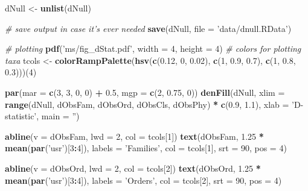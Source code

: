 \documentclass[]{article}
\newenvironment{Shaded}{\begin{snugshade}}{\end{snugshade}}
\newcommand{\KeywordTok}[1]{\textcolor[rgb]{0.13,0.29,0.53}{\textbf{#1}}}
\newcommand{\DataTypeTok}[1]{\textcolor[rgb]{0.13,0.29,0.53}{#1}}
\newcommand{\DecValTok}[1]{\textcolor[rgb]{0.00,0.00,0.81}{#1}}
\newcommand{\FloatTok}[1]{\textcolor[rgb]{0.00,0.00,0.81}{#1}}
\newcommand{\StringTok}[1]{\textcolor[rgb]{0.31,0.60,0.02}{#1}}
\newcommand{\CommentTok}[1]{\textcolor[rgb]{0.56,0.35,0.01}{\textit{#1}}}
\newcommand{\OperatorTok}[1]{\textcolor[rgb]{0.81,0.36,0.00}{\textbf{#1}}}
\newcommand{\NormalTok}[1]{#1}
\begin{document}
\begin{Shaded}
\begin{Highlighting}[]
\NormalTok{dNull <-}\StringTok{ }\KeywordTok{unlist}\NormalTok{(dNull)}


\CommentTok{# save output in case it's ever needed}
\KeywordTok{save}\NormalTok{(dNull, }\DataTypeTok{file =} \StringTok{'data/dnull.RData'}\NormalTok{)}


\CommentTok{# plotting}
\KeywordTok{pdf}\NormalTok{(}\StringTok{'ms/fig_dStat.pdf'}\NormalTok{, }\DataTypeTok{width =} \DecValTok{4}\NormalTok{, }\DataTypeTok{height =} \DecValTok{4}\NormalTok{)}
\CommentTok{# colors for plotting taxa}
\NormalTok{tcols <-}\StringTok{ }\KeywordTok{colorRampPalette}\NormalTok{(}\KeywordTok{hsv}\NormalTok{(}\KeywordTok{c}\NormalTok{(}\FloatTok{0.12}\NormalTok{, }\DecValTok{0}\NormalTok{, }\FloatTok{0.02}\NormalTok{), }\KeywordTok{c}\NormalTok{(}\DecValTok{1}\NormalTok{, }\FloatTok{0.9}\NormalTok{, }\FloatTok{0.7}\NormalTok{), }\KeywordTok{c}\NormalTok{(}\DecValTok{1}\NormalTok{, }\FloatTok{0.8}\NormalTok{, }\FloatTok{0.3}\NormalTok{)))(}\DecValTok{4}\NormalTok{)}

\KeywordTok{par}\NormalTok{(}\DataTypeTok{mar =} \KeywordTok{c}\NormalTok{(}\DecValTok{3}\NormalTok{, }\DecValTok{3}\NormalTok{, }\DecValTok{0}\NormalTok{, }\DecValTok{0}\NormalTok{) }\OperatorTok{+}\StringTok{ }\FloatTok{0.5}\NormalTok{, }\DataTypeTok{mgp =} \KeywordTok{c}\NormalTok{(}\DecValTok{2}\NormalTok{, }\FloatTok{0.75}\NormalTok{, }\DecValTok{0}\NormalTok{))}
\KeywordTok{denFill}\NormalTok{(dNull, }\DataTypeTok{xlim =} \KeywordTok{range}\NormalTok{(dNull, dObsFam, dObsOrd, dObsCls, dObsPhy) }\OperatorTok{*}\StringTok{ }\KeywordTok{c}\NormalTok{(}\FloatTok{0.9}\NormalTok{, }\FloatTok{1.1}\NormalTok{), }
        \DataTypeTok{xlab =} \StringTok{'D-statistic'}\NormalTok{, }\DataTypeTok{main =} \StringTok{''}\NormalTok{)}

\KeywordTok{abline}\NormalTok{(}\DataTypeTok{v =}\NormalTok{ dObsFam, }\DataTypeTok{lwd =} \DecValTok{2}\NormalTok{, }\DataTypeTok{col =}\NormalTok{ tcols[}\DecValTok{1}\NormalTok{])}
\KeywordTok{text}\NormalTok{(dObsFam, }\FloatTok{1.25} \OperatorTok{*}\StringTok{ }\KeywordTok{mean}\NormalTok{(}\KeywordTok{par}\NormalTok{(}\StringTok{'usr'}\NormalTok{)[}\DecValTok{3}\OperatorTok{:}\DecValTok{4}\NormalTok{]), }\DataTypeTok{labels =} \StringTok{'Families'}\NormalTok{, }\DataTypeTok{col =}\NormalTok{ tcols[}\DecValTok{1}\NormalTok{],}
     \DataTypeTok{srt =} \DecValTok{90}\NormalTok{, }\DataTypeTok{pos =} \DecValTok{4}\NormalTok{)}

\KeywordTok{abline}\NormalTok{(}\DataTypeTok{v =}\NormalTok{ dObsOrd, }\DataTypeTok{lwd =} \DecValTok{2}\NormalTok{, }\DataTypeTok{col =}\NormalTok{ tcols[}\DecValTok{2}\NormalTok{])}
\KeywordTok{text}\NormalTok{(dObsOrd, }\FloatTok{1.25} \OperatorTok{*}\StringTok{ }\KeywordTok{mean}\NormalTok{(}\KeywordTok{par}\NormalTok{(}\StringTok{'usr'}\NormalTok{)[}\DecValTok{3}\OperatorTok{:}\DecValTok{4}\NormalTok{]), }\DataTypeTok{labels =} \StringTok{'Orders'}\NormalTok{, }\DataTypeTok{col =}\NormalTok{ tcols[}\DecValTok{2}\NormalTok{],}
     \DataTypeTok{srt =} \DecValTok{90}\NormalTok{, }\DataTypeTok{pos =} \DecValTok{4}\NormalTok{)}


\end{Highlighting}
\end{Shaded}
\end{document}

